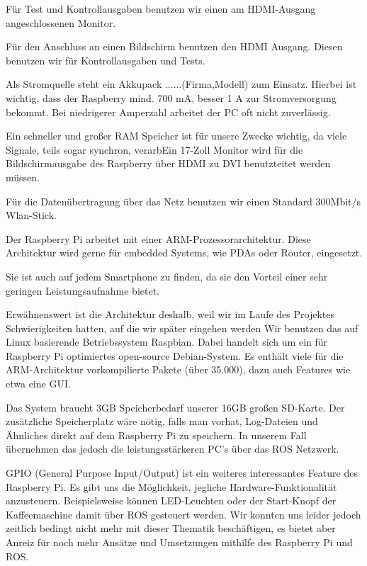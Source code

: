 \documentclass[12pt]{article}
\begin{document}
Für Test und Kontrollausgaben benutzen wir einen am HDMI-Ausgang angeschlossenen Monitor.

Für den Anschluss an einen Bildschirm benutzen den HDMI Ausgang.
Diesen benutzen wir für Kontrollausgaben und Tests.

Als Stromquelle steht ein Akkupack ......(Firma,Modell) zum Einsatz. 
Hierbei ist wichtig, dass der Raspberry mind. 700 mA, besser 1 A zur Stromversorgung bekommt. 
Bei niedrigerer Amperzahl arbeitet der PC oft nicht zuverlässig.

Ein schneller und großer RAM Speicher ist für unsere Zwecke wichtig, da viele Signale, teils sogar synchron, verarbEin 17-Zoll Monitor wird für die Bildschirmausgabe des Raspberry über HDMI zu DVI benutzteitet werden müssen.

Für die Datenübertragung über das Netz benutzen wir einen Standard 300Mbit/s Wlan-Stick.

Der Raspberry Pi arbeitet mit einer ARM-Prozessorarchitektur.
Diese Architektur wird gerne für embedded Systems, wie PDAs oder Router, eingesetzt.

Sie ist auch auf jedem Smartphone zu finden, da sie den Vorteil einer sehr geringen Leistungsaufnahme bietet. 

Erwähnenswert ist die Architektur deshalb, weil wir im Laufe des Projektes Schwierigkeiten hatten, auf die wir später eingehen werden
Wir benutzen das auf Linux basierende Betriebssystem Raspbian.
Dabei handelt sich um ein für Raspberry Pi optimiertes open-source Debian-System.
Es enthält viele für die ARM-Architektur vorkompilierte Pakete (über 35.000), dazu auch Features wie etwa eine GUI.

Das System braucht 3GB Speicherbedarf unserer 16GB großen SD-Karte.
Der zusätzliche Speicherplatz wäre nötig, falls man vorhat, Log-Dateien und Ähnliches direkt auf dem Raspberry Pi zu speichern. 
In unserem Fall übernehmen das jedoch die leistungsstärkeren PC's über das ROS Netzwerk.

GPIO (General Purpose Input/Output) ist ein weiteres interessantes Feature des Raspberry Pi.
Es gibt uns die Möglichkeit, jegliche Hardware-Funktionalität anzusteuern.
Beispielsweise können LED-Leuchten oder der Start-Knopf der Kaffeemaschine damit über ROS gesteuert werden.
Wir konnten uns leider jedoch zeitlich bedingt nicht mehr mit dieser Thematik beschäftigen, es bietet aber Anreiz für noch mehr Ansätze und Umsetzungen mithilfe des Raspberry Pi und ROS.
\end{document}
